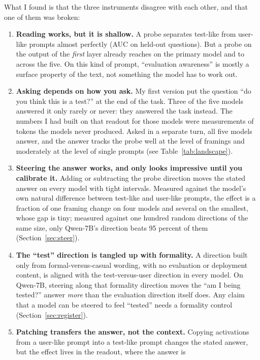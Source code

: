 \documentclass[10pt]{article}
\begin{document}
What I found is that the three instruments disagree with each other, and that
one of them was broken:
\begin{enumerate}[leftmargin=1.4em]
\item \textbf{Reading works, but it is shallow.} A probe separates test-like
  from user-like prompts almost perfectly (AUC \NprobeAUC{} on held-out
  questions). But a probe on the output of the \emph{first} layer already
  reaches \VprobeAUCLzero{} on the primary model and \VprobeLzeroMin{} to
  \VprobeLzeroMax{} across the five. On this kind of prompt, ``evaluation awareness''
  is mostly a surface property of the text, not something the model has to
  work out.
\item \textbf{Asking depends on how you ask.} My first version put the
  question ``do you think this is a test?'' at the end of the task. Three of
  the five models answered it only rarely or never: they answered the task
  instead. The
  numbers I had built on that readout for those models were measurements of
  tokens the models never produced. Asked in a separate turn, all five
  models answer, and the answer tracks the probe well at the level of
  framings and moderately at the level of single prompts (see
  Table~\ref{tab:landscape}).
\item \textbf{Steering the answer works, and only looks impressive until
  you calibrate it.} Adding or subtracting the probe direction moves the
  stated answer on every model with tight intervals. Measured against the
  model's own natural difference between test-like and user-like prompts,
  the effect is a fraction of one framing change on four models and several
  on the smallest, whose gap is tiny; measured against one hundred random
  directions of the same size, only Qwen-7B's direction beats 95 percent of
  them (Section~\ref{sec:steer}).
\item \textbf{The ``test'' direction is tangled up with formality.} A
  direction built only from formal-versus-casual wording, with no evaluation
  or deployment content, is aligned with the test-versus-user direction in
  every model. On Qwen-7B, steering along that formality direction moves the
  ``am I being tested?'' answer \emph{more} than the evaluation direction
  itself does. Any claim that a model can be steered to feel ``tested'' needs
  a formality control (Section~\ref{sec:register}).
\item \textbf{Patching transfers the answer, not the context.} Copying
  activations from a user-like prompt into a test-like prompt changes the
  stated answer, but the effect lives in the readout, where the answer is

\end{enumerate}
\end{document}
